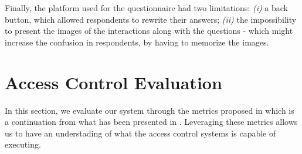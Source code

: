 Finally, the platform used for the questionnaire had two limitations: \textit{(i)} a back button, which allowed respondents to rewrite their answers; \textit{(ii)} the impossibility to present the images of the interactions along with the questions - which might increase the confusion in respondents, by having to memorize the images.

\section{Access Control Evaluation}

In this section, we evaluate our system through the metrics proposed in \cite{hu_guidelines_2012} which is a continuation from what has been presented in \cite{hu_assessment_2006}. Leveraging these metrics allows us to have an understading of what the access control systems is capable of executing.

